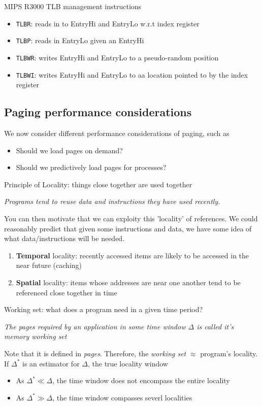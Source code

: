 \documentclass[journal, letterpaper]{IEEEtran}
\begin{document}
\begin{example}{MIPS R3000 TLB management instructions} \\
    \begin{itemize}
        \item \verb|TLBR|: reads in to EntryHi and EntryLo w.r.t index register
        \item \verb|TLBP|: reads in EntryLo given an EntryHi
        \item \verb|TLBWR|: writes EntryHi and EntryLo to a pseudo-random position
        \item \verb|TLBWI|: writes EntryHi and EntryLo to aa location pointed to by the index register
    \end{itemize}
\end{example}
\subsection{Paging performance considerations}
We now consider different performance considerations of paging, such as
\begin{itemize}
    \item Should we load pages on demand?
    \item Should we predictively load pages for processes?
\end{itemize}
\begin{theory}{Principle of Locality: things close together are used together}
    \begin{center}
        \textit{Programs tend to reuse data and instructions they have used recently.}
    \end{center}
    You can then motivate that we can exploity this 'locality' of references. We could reasonably predict that given some instructions and data, we have some idea of what data/instructions will be needed.
    \begin{enumerate}
        \item \textbf{Temporal} locality: recently accessed items are likely to be accessed in the near future (caching)
        \item \textbf{Spatial} locality: items whose addresses are near one another tend to be referenced close together in time
    \end{enumerate}
\end{theory}
\begin{theory}{Working set: what does a program need in a given time period?}
    \begin{center}
        \textit{The pages required by an application in some time window $\Delta$ is called it's memory working set}
    \end{center}
    Note that it is defined in \textit{pages}. Therefore, the \textit{working set} $\approx$ program's locality. If $\Delta^*$ is an estimator for $\Delta$, the true locality window
    \begin{itemize}
        \item As $\Delta^* \ll \Delta$, the time window does not encompass the entire locality
        \item As $\Delta^* \gg \Delta$, the time window compasses severl localities
    \end{itemize}
\end{theory}
\end{document}
